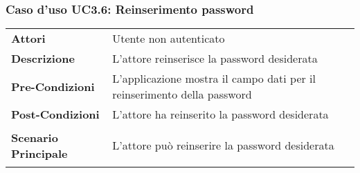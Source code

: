 \subsubsection{Caso d'uso UC3.6: Reinserimento password}
\label{UC3_6}

\begin{longtable}{ l | p{11cm}}
	\hline
	\rowcolor{Gray}
	 \multicolumn{2}{c}{UC3.6 - Reinserimento password} \\
	 \hline
	\textbf{Attori} & Utente non autenticato \\
	\textbf{Descrizione} & L'attore reinserisce la password desiderata  \\
	\textbf{Pre-Condizioni} & L'applicazione mostra il campo dati per il reinserimento della password \\
	\textbf{Post-Condizioni} & L'attore ha reinserito la password desiderata \\
	\textbf{Scenario Principale} & \begin{enumerate*}[label=(\arabic*.),itemjoin={\newline}]
		\item L'attore può reinserire la password desiderata
	\end{enumerate*}\\
\end{longtable}